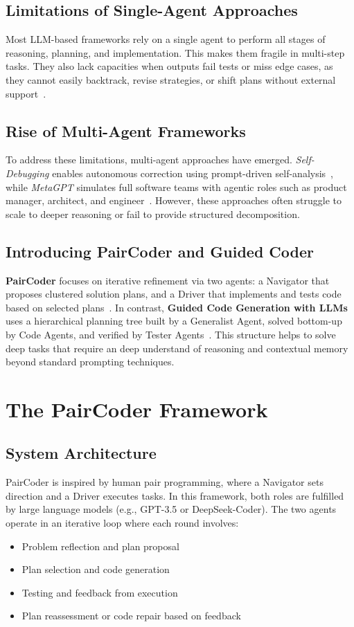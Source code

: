 \documentclass[11pt,a4paper]{article}
\begin{document}
\subsection{Limitations of Single-Agent Approaches}
Most LLM-based frameworks rely on a single agent to perform all stages of reasoning, planning, and implementation. This makes them fragile in multi-step tasks. They also lack capacities when outputs fail tests or miss edge cases, as they cannot easily backtrack, revise strategies, or shift plans without external support~\cite{zhang2024paircoder}.

\subsection{Rise of Multi-Agent Frameworks}
To address these limitations, multi-agent approaches have emerged. \textit{Self-Debugging} enables autonomous correction using prompt-driven self-analysis~\cite{chen2024selfdebugging}, while \textit{MetaGPT} simulates full software teams with agentic roles such as product manager, architect, and engineer~\cite{metagpt2023}. However, these approaches often struggle to scale to deeper reasoning or fail to provide structured decomposition.

\subsection{Introducing PairCoder and Guided Coder}
\textbf{PairCoder} focuses on iterative refinement via two agents: a Navigator that proposes clustered solution plans, and a Driver that implements and tests code based on selected plans~\cite{zhang2024paircoder}. In contrast, \textbf{Guided Code Generation with LLMs} uses a hierarchical planning tree built by a Generalist Agent, solved bottom-up by Code Agents, and verified by Tester Agents~\cite{almorsi2025guided}. This structure helps to solve deep tasks that require an deep understand of reasoning and contextual memory beyond standard prompting techniques.


\section{The PairCoder Framework}
\subsection{System Architecture}
PairCoder is inspired by human pair programming, where a Navigator sets direction and a Driver executes tasks. In this framework, both roles are fulfilled by large language models (e.g., GPT-3.5 or DeepSeek-Coder). The two agents operate in an iterative loop where each round involves:
\begin{itemize}
\item Problem reflection and plan proposal 
\item Plan selection and code generation
\item Testing and feedback from execution
\item Plan reassessment or code repair based on feedback
\end{itemize}
\end{document}

